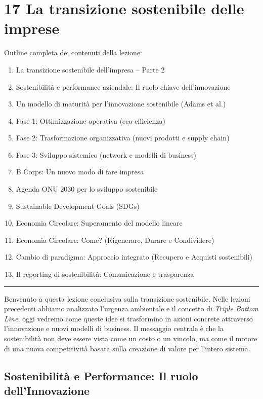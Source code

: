 \documentclass[a4paper,10pt]{article}
\begin{document}
\section*{17 La transizione sostenibile delle imprese}

Outline completa dei contenuti della lezione:
{\small
\begin{enumerate}
\item La transizione sostenibile dell’impresa – Parte 2
\item Sostenibilità e performance aziendale: Il ruolo chiave dell’innovazione
\item Un modello di maturità per l’innovazione sostenibile (Adams et al.)
\item Fase 1: Ottimizzazione operativa (eco-efficienza)
\item Fase 2: Trasformazione organizzativa (nuovi prodotti e supply chain)
\item Fase 3: Sviluppo sistemico (network e modelli di business)
\item B Corps: Un nuovo modo di fare impresa
\item Agenda ONU 2030 per lo sviluppo sostenibile
\item Sustainable Development Goals (SDGs)
\item Economia Circolare: Superamento del modello lineare
\item Economia Circolare: Come? (Rigenerare, Durare e Condividere)
\item Cambio di paradigma: Approccio integrato (Recupero e Acquisti sostenibili)
\item Il reporting di sostenibilità: Comunicazione e trasparenza
\end{enumerate}
}
\hrule
\vspace{0.5cm}

Benvenuto a questa lezione conclusiva sulla transizione sostenibile. Nelle lezioni precedenti abbiamo analizzato l'urgenza ambientale e il concetto di \textit{Triple Bottom Line}; oggi vedremo come queste idee si trasformino in azioni concrete attraverso l'innovazione e nuovi modelli di business. Il messaggio centrale è che la sostenibilità non deve essere vista come un costo o un vincolo, ma come il motore di una nuova competitività basata sulla creazione di valore per l'intero sistema.

\subsection*{Sostenibilità e Performance: Il ruolo dell'Innovazione}
\end{document}
